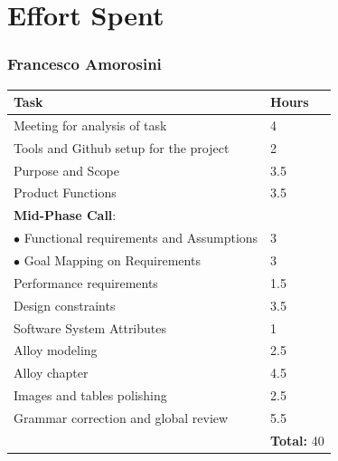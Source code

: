 \documentclass{report}
\begin{document}
\chapter{Effort Spent}
\subsection*{Francesco Amorosini}
\begin{table}[!ht]
	\begin{tabular}{|C{.60\textwidth}||C{.20\textwidth}|}
		\toprule
		\textbf{Task} & \textbf{Hours}\\
		\midrule
		\midrule
		Meeting for analysis of task & 4\\
		\midrule
		Tools and Github setup for the project & 2\\
		\midrule
		Purpose and Scope & 3.5\\
		\midrule
		Product Functions& 3.5\\ 
		\midrule
		\small{\textbf{Mid-Phase Call}}: & \\
		\vspace{.2mm}
		$\bullet$ Functional requirements and Assumptions & \vspace{.2mm} 3\\
		$\bullet$ Goal Mapping on Requirements & 3\\
		\midrule
		Performance requirements & 1.5\\
		\midrule
		Design constraints & 3.5\\
		\midrule
		Software System Attributes & 1\\
		\midrule
		Alloy modeling & 2.5\\
		\midrule
		Alloy chapter & 4.5\\
		\midrule
		Images and tables polishing & 2.5\\
		\midrule
		Grammar correction and global review & 5.5\\
		\midrule
		& \textbf{Total:} 40\\
		\bottomrule
	\end{tabular}
\end{table}
\end{document}
